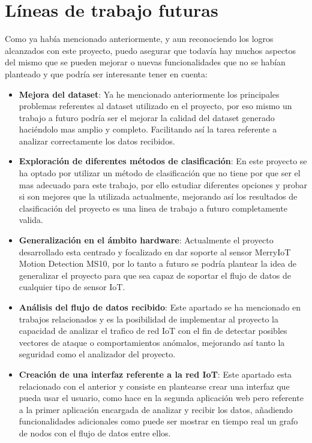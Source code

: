 \section{Líneas de trabajo futuras}

Como ya había mencionado anteriormente, y aun reconociendo los logros alcanzados con este proyecto, puedo asegurar que todavía hay muchos aspectos del mismo que se pueden mejorar o nuevas funcionalidades que no se habían planteado y que podría ser interesante tener en cuenta:

\begin{itemize}
    \item \textbf{Mejora del dataset}:
    Ya he mencionado anteriormente los principales problemas referentes al dataset utilizado en el proyecto, por eso mismo un trabajo a futuro podría ser el mejorar la calidad del dataset generado haciéndolo mas amplio y completo. Facilitando así la tarea referente a analizar correctamente los datos recibidos.
    
    \item \textbf{Exploración de diferentes métodos de clasificación}:
    En este proyecto se ha optado por utilizar un método de clasificación que no tiene por que ser el mas adecuado para este trabajo, por ello estudiar diferentes opciones y probar si son mejores que la utilizada actualmente, mejorando así los resultados de clasificación del proyecto es una linea de trabajo a futuro completamente valida.
    
    \item \textbf{Generalización en el ámbito hardware}:
    Actualmente el proyecto desarrollado esta centrado y focalizado en dar soporte al sensor MerryIoT Motion Detection MS10, por lo tanto a futuro se podría plantear la idea de generalizar el proyecto para que sea capaz de soportar el flujo de datos de cualquier tipo de sensor IoT.
    
    \item \textbf{Análisis del flujo de datos recibido}:
    Este apartado se ha mencionado en trabajos relacionados y es la posibilidad de implementar al proyecto la capacidad de analizar el trafico de red IoT con el fin de detectar posibles vectores de ataque o comportamientos anómalos, mejorando así tanto la seguridad como el analizador del proyecto.
    
    \item \textbf{Creación de una interfaz referente a la red IoT}:
    Este apartado esta relacionado con el anterior y consiste en plantearse crear una interfaz que pueda usar el usuario, como hace en la segunda aplicación web pero referente a la primer aplicación encargada de analizar y recibir los datos, añadiendo funcionalidades adicionales como puede ser mostrar en tiempo real un grafo de nodos con el flujo de datos entre ellos.
\end{itemize}